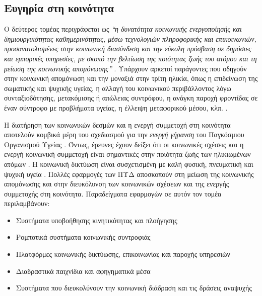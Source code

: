 \subsection{Ευγηρία στη κοινότητα}

Ο δεύτερος τομέας περιγράφεται ως \textit{``η δυνατότητα κοινωνικής ενεργοποίησής και δημιουργικότητας καθημερινότητας, μέσω τεχνολογιών πληροφορικής και επικοινωνιών, προσανατολισμένες στην κοινωνική διασύνδεση και την εύκολη πρόσβαση σε δημόσιες και εμπορικές υπηρεσίες, με σκοπό την βελτίωση της ποιότητας ζωής του ατόμου και τη μείωση της κοινωνικής απομόνωσης''} \cite{broek}.
Υπάρχουν αρκετοί παράγοντες που οδηγούν στην κοινωνική απομόνωση και την μοναξιά στην τρίτη ηλικία, όπως η επιδείνωση της σωματικής και ψυχικής υγείας, η αλλαγή του κοινωνικού περιβάλλοντος λόγω συνταξιοδότησης, μετακόμισης ή απώλειας συντρόφου, η ανάγκη παροχή φροντίδας σε έναν σύντροφο με προβλήματα υγείας, η έλλειψη μεταφορικού μέσου, κλπ. \cite{Wherton2009}.
\par
Η διατήρηση των κοινωνικών δεσμών και η ενεργή συμμετοχή στη κοινότητα αποτελούν κομβικά μέρη του σχεδιασμού για την \textit{ενεργή γήρανση} του Παγκόσμιου Οργανισμού Υγείας \cite{WHO2015}.
Όντως, έρευνες έχουν δείξει ότι οι κοινωνικές σχέσεις και η ενεργή κοινωνική συμμετοχή είναι σημαντικές στην ποιότητα ζωής των ηλικιωμένων ατόμων \cite{Bowling2003}\cite{GABRIEL2004}.
Η κοινωνική δικτύωση είναι συσχετισμένη με καλή φυσική, πνευματική και ψυχική υγεία \cite{Luanaigh2008}\cite{Shankar2011}\cite{Thurston2009}.
Πολλές εφαρμογές των ΠΥΔ αποσκοπούν στη μείωση της κοινωνικής απομόνωσης και στην διευκόλυνση των κοινωνικών σχέσεων και της ενεργής συμμετοχής στη κοινότητα.
Παραδείγματα εφαρμογών σε αυτόν τον τομέα περιλαμβάνουν:
\begin{itemize}
    \item Συστήματα υποβοήθησης κινητικότητας και πλοήγησης
    \item Ρομποτικά συστήματα κοινωνικής συντροφιάς
    \item Πλατφόρμες κοινωνικής δικτύωσης, επικοινωνίας και παροχής υπηρεσιών
    \item Διαδραστικά παιχνίδια και αφηγηματικά μέσα
    \item Συστήματα που διευκολύνουν την κοινωνική διάδραση και τις δράσεις αναψυχής
\end{itemize}{}

